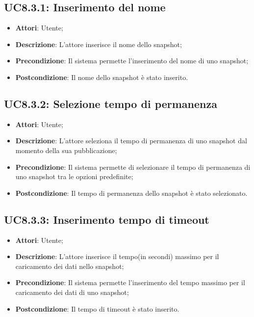 \subsection{UC8.3.1: Inserimento del nome}
\begin{itemize}
	\item \textbf{Attori}: Utente;
	\item \textbf{Descrizione}: L'attore inserisce il nome dello snapshot;
	\item \textbf{Precondizione}: Il sistema permette l'inserimento del nome di uno snapshot;
	\item \textbf{Postcondizione}: Il nome dello snapshot è stato inserito.
\end{itemize}

\subsection{UC8.3.2: Selezione tempo di permanenza}
\begin{itemize}
	\item \textbf{Attori}: Utente;
	\item \textbf{Descrizione}: L'attore seleziona il tempo di permanenza di uno snapshot dal momento della sua pubblicazione;
	\item \textbf{Precondizione}: Il sistema permette di selezionare il tempo di permanenza di uno snapshot tra le opzioni predefinite;
	\item \textbf{Postcondizione}: Il tempo di permanenza dello snapshot è stato selezionato.
\end{itemize}

\subsection{UC8.3.3: Inserimento tempo di timeout}
\begin{itemize}
	\item \textbf{Attori}: Utente;
	\item \textbf{Descrizione}: L'attore inserisce il tempo(in secondi) massimo per il caricamento dei dati nello snapshot;
	\item \textbf{Precondizione}: Il sistema permette l'inserimento del tempo massimo per il caricamento dei dati di uno snapshot;
	\item \textbf{Postcondizione}: Il tempo di timeout è stato inserito.
\end{itemize}

